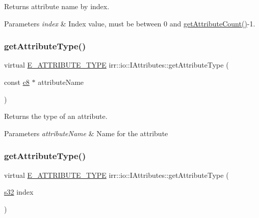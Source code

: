 Returns attribute name by index. 


\begin{DoxyParams}{Parameters}
{\em index} & Index value, must be between 0 and \hyperlink{classirr_1_1io_1_1IAttributes_a796bdd9440ee7ba0b6742a90a82870b6}{get\+Attribute\+Count()}-\/1. \\
\hline
\end{DoxyParams}
\mbox{\label{classirr_1_1io_1_1IAttributes_af14805d54f8cfae0a76751d13931390a}} 
\subsubsection{\texorpdfstring{get\+Attribute\+Type()}{getAttributeType()}\hspace{0.1cm}{\footnotesize\ttfamily [1/2]}}
{\footnotesize\ttfamily virtual \hyperlink{namespaceirr_1_1io_a874a5f14dbe2e45c40c2bb29e9f0ebcb}{E\+\_\+\+A\+T\+T\+R\+I\+B\+U\+T\+E\+\_\+\+T\+Y\+PE} irr\+::io\+::\+I\+Attributes\+::get\+Attribute\+Type (\begin{DoxyParamCaption}\item[{const \hyperlink{namespaceirr_a9395eaea339bcb546b319e9c96bf7410}{c8} $\ast$}]{attribute\+Name }\end{DoxyParamCaption})\hspace{0.3cm}{\ttfamily [pure virtual]}}



Returns the type of an attribute. 


\begin{DoxyParams}{Parameters}
{\em attribute\+Name} & Name for the attribute \\
\hline
\end{DoxyParams}
\mbox{\label{classirr_1_1io_1_1IAttributes_a2cb0eb3befcbf7feb2bbdd4676c53954}} 
\subsubsection{\texorpdfstring{get\+Attribute\+Type()}{getAttributeType()}\hspace{0.1cm}{\footnotesize\ttfamily [2/2]}}
{\footnotesize\ttfamily virtual \hyperlink{namespaceirr_1_1io_a874a5f14dbe2e45c40c2bb29e9f0ebcb}{E\+\_\+\+A\+T\+T\+R\+I\+B\+U\+T\+E\+\_\+\+T\+Y\+PE} irr\+::io\+::\+I\+Attributes\+::get\+Attribute\+Type (\begin{DoxyParamCaption}\item[{\hyperlink{namespaceirr_ac66849b7a6ed16e30ebede579f9b47c6}{s32}}]{index }\end{DoxyParamCaption})\hspace{0.3cm}{\ttfamily [pure virtual]}}



